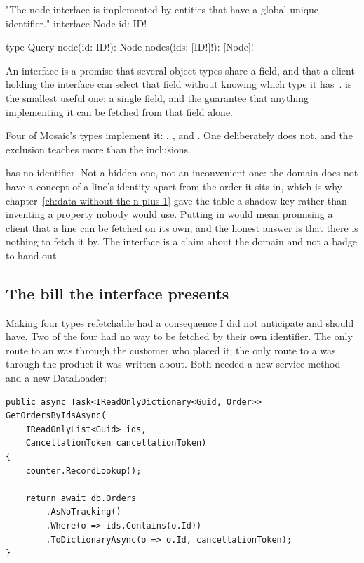 \begin{graphqlsdl}
"The node interface is implemented by entities that have a global unique identifier."
interface Node {
  id: ID!
}

type Query {
  node(id: ID!): Node
  nodes(ids: [ID!]!): [Node]!
}
\end{graphqlsdl}

An interface is a promise that several object types share a field, and that a
client holding the interface can select that field without knowing which type it
has~\autocite{graphql2025spec}.  is the smallest useful one: a single
field, and the guarantee that anything implementing it can be fetched from that
field alone.

Four of Mosaic's types implement it: , ,
 and . One deliberately does not, and the exclusion
teaches more than the inclusions.

%
 has no identifier. Not a hidden one, not an inconvenient one:
the domain does not have a concept of a line's identity apart from the order it
sits in, which is why chapter~\ref{ch:data-without-the-n-plus-1} gave the table
a shadow key rather than inventing a property nobody would use. Putting
 in  would mean promising a client that a line can be
fetched on its own, and the honest answer is that there is nothing to fetch it
by. The interface is a claim about the domain and not a badge to hand out.

\subsection*{The bill the interface presents}

%
Making four types refetchable had a consequence I did not anticipate and should
have. Two of the four had no way to be fetched by their own identifier. The only
route to an  was through the customer who placed it; the only route
to a  was through the product it was written about. Both needed a
new service method and a new DataLoader:

\begin{verbatim}
public async Task<IReadOnlyDictionary<Guid, Order>> GetOrdersByIdsAsync(
    IReadOnlyList<Guid> ids,
    CancellationToken cancellationToken)
{
    counter.RecordLookup();

    return await db.Orders
        .AsNoTracking()
        .Where(o => ids.Contains(o.Id))
        .ToDictionaryAsync(o => o.Id, cancellationToken);
}
\end{verbatim}

